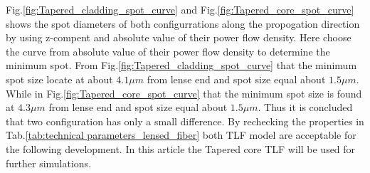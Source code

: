 Fig.\ref{fig:Tapered_cladding_spot_curve} and Fig.\ref{fig:Tapered_core_spot_curve} shows the spot diameters of both configurrations along the propogation direction by using z-compent and absolute value of their power flow density. Here choose the curve from absolute value of their power flow density to determine the minimum spot. From Fig.\ref{fig:Tapered_cladding_spot_curve} that the minimum spot size locate at about $4.1 \mu m$ from lense end and spot size equal about $1.5 \mu m$. While in Fig.\ref{fig:Tapered_core_spot_curve} that the minimum spot size is found at  $4.3 \mu m$ from lense end and spot size equal about $1.5 \mu m$. Thus it is concluded that two configuration has only a small difference. By rechecking the properties in Tab.\ref{tab:technical parameters_lensed_fiber} both TLF model are acceptable for the following development. In this article the Tapered core TLF will be used for further simulations. 
